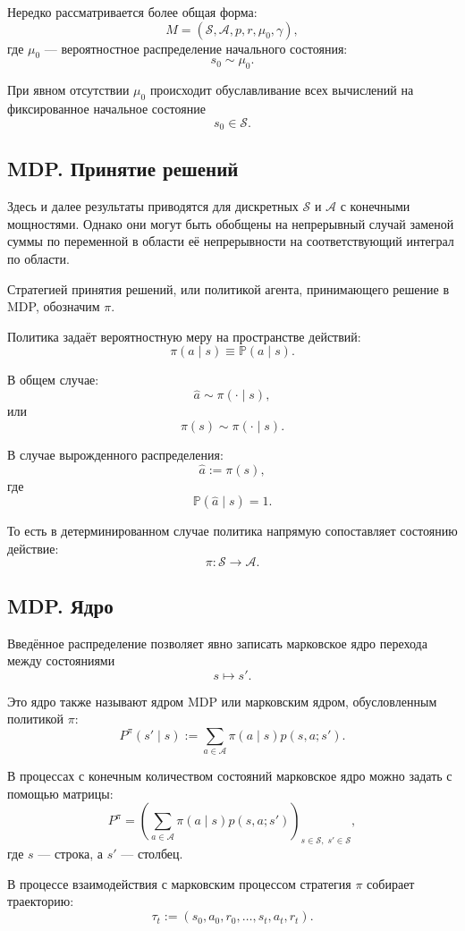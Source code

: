 \documentclass[12pt,a4paper]{article}
\begin{document}
Нередко рассматривается более общая форма:
\[
M = (\mathcal S, \mathcal A, p, r, \mu_0, \gamma),
\]
где $\mu_0$ --- вероятностное распределение начального состояния:
\[
s_0 \sim \mu_0.
\]

При явном отсутствии $\mu_0$ происходит обуславливание всех вычислений на фиксированное начальное состояние
\[
s_0 \in \mathcal S.
\]

\subsection{MDP. Принятие решений}

Здесь и далее результаты приводятся для дискретных $\mathcal S$ и $\mathcal A$ с конечными мощностями. Однако они могут быть обобщены на непрерывный случай заменой суммы по переменной в области её непрерывности на соответствующий интеграл по области.

Стратегией принятия решений, или политикой агента, принимающего решение в MDP, обозначим $\pi$.

Политика задаёт вероятностную меру на пространстве действий:
\[
\pi(a \mid s) \equiv \mathbb P(a \mid s).
\]

В общем случае:
\[
\hat a \sim \pi(\cdot \mid s),
\]
или
\[
\pi(s) \sim \pi(\cdot \mid s).
\]

В случае вырожденного распределения:
\[
\hat a := \pi(s),
\]
где
\[
\mathbb P(\hat a \mid s) = 1.
\]

То есть в детерминированном случае политика напрямую сопоставляет состоянию действие:
\[
\pi : \mathcal S \to \mathcal A.
\]

\subsection{MDP. Ядро}

Введённое распределение позволяет явно записать марковское ядро перехода между состояниями
\[
s \mapsto s'.
\]

Это ядро также называют ядром MDP или марковским ядром, обусловленным политикой $\pi$:
\[
P^\pi(s' \mid s)
:=
\sum_{a \in \mathcal A} \pi(a \mid s) p(s,a;s').
\]

В процессах с конечным количеством состояний марковское ядро можно задать с помощью матрицы:
\[
P^\pi =
\left(
\sum_{a \in \mathcal A} \pi(a \mid s)p(s,a;s')
\right)_{s \in \mathcal S,\; s' \in \mathcal S},
\]
где $s$ --- строка, а $s'$ --- столбец.

В процессе взаимодействия с марковским процессом стратегия $\pi$ собирает траекторию:
\[
\tau_t := (s_0,a_0,r_0,\ldots,s_t,a_t,r_t).
\]
\end{document}
